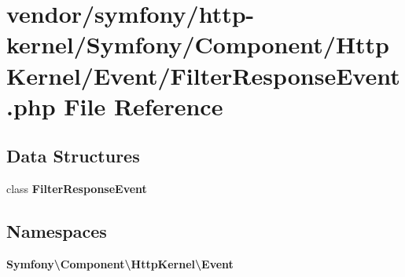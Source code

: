\section{vendor/symfony/http-\/kernel/\+Symfony/\+Component/\+Http\+Kernel/\+Event/\+Filter\+Response\+Event.php File Reference}
\label{_filter_response_event_8php}
\subsection*{Data Structures}
\begin{DoxyCompactItemize}
\item 
class {\bf Filter\+Response\+Event}
\end{DoxyCompactItemize}
\subsection*{Namespaces}
\begin{DoxyCompactItemize}
\item 
 {\bf Symfony\textbackslash{}\+Component\textbackslash{}\+Http\+Kernel\textbackslash{}\+Event}
\end{DoxyCompactItemize}
